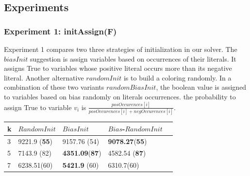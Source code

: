 \documentclass[12pt,a4paper,twoside]{scrartcl}
\numberwithin{equation}{section}
\begin{document}
\subsection{Experiments}
\subsubsection{Experiment 1: initAssign(F)}
Experiment 1 compares two three strategies of initialization in our solver. The $biasInit$ suggestion is assign variables based on occurrences of their literals. It assigns True to variables whose positive literal occurs more than its negative literal. Another alternative $randomInit$ is to build a coloring randomly. In a combination of these two variants $randomBiasInit$, the boolean value is assigned to variables based on bias randomly on literals occurrences. the probability to assign True to variable $v_i$ is $\frac{posOccurences[i]}{posOccurences[i]+negOccurences[i]}$. \\
\begin{table}[H]
\begin{center}
    \begin{tabular}{|l|l|l|l|p{1cm}|}
\hline 
    k &$RandomInit$&$BiasInit$&$Bias$-$RandomInit$ \\ \hline
	3&9221.9 (\textbf{55})&9157.76 (54)&\textbf{ 9078.27}(\textbf{55}) \\ \hline
	5&7143.9 (82)&\textbf{4351.09}(\textbf{87})&4582.54 (\textbf{87})\\ \hline

	7& 	6238.51(60)&\textbf{5421.9} (60)& 6310.7(60)\\ \hline
	
\end{tabular}
\end{center}
\end{table} 
\end{document}
